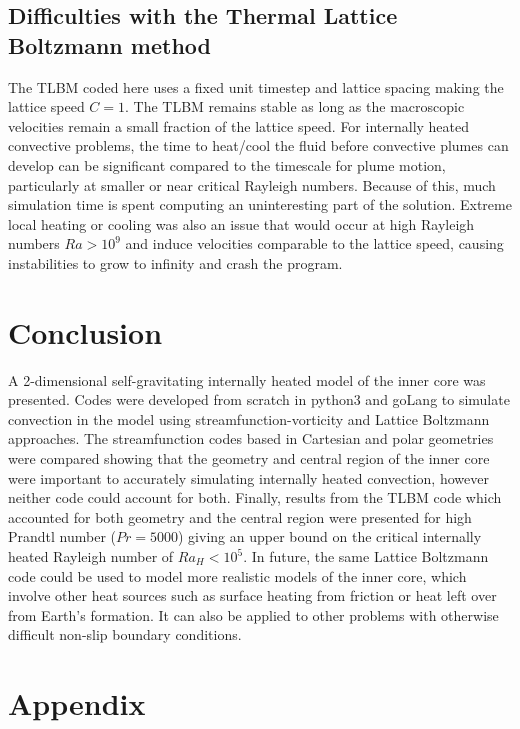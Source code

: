 \documentclass{article}
\begin{document}
\subsection*{Difficulties with the Thermal Lattice Boltzmann method}
The TLBM coded here uses a fixed unit timestep and lattice spacing making the lattice speed $C=1$. The TLBM remains stable as long as the macroscopic velocities remain a small fraction of the lattice speed. For internally heated convective problems, the time to heat/cool the fluid before convective plumes can develop can be significant compared to the timescale for plume motion, particularly at smaller or near critical Rayleigh numbers. Because of this, much simulation time is spent computing an uninteresting part of the solution. 
\newline
\noindent Extreme local heating or cooling was also an issue that would occur at high Rayleigh numbers $Ra>10^9$ and induce velocities comparable to the lattice speed, causing instabilities to grow to infinity and crash the program.
\newline



\section*{Conclusion}

A 2-dimensional self-gravitating internally heated model of the inner core was presented. Codes 
were developed from scratch in python3 and goLang to simulate convection in the model using 
streamfunction-vorticity and Lattice Boltzmann approaches. The streamfunction codes based in 
Cartesian and polar geometries were compared showing that the geometry and central region of the 
inner core were important to accurately simulating internally heated convection, however neither 
code could account for both. Finally, results from the TLBM code which accounted for both geometry 
and the central region were presented for high Prandtl number ($Pr=5000$) giving an upper bound on 
the critical internally heated Rayleigh number of $Ra_H < 10^5$. In future, the same Lattice Boltzmann
code could be used to model more realistic models of the inner core, which involve other heat sources such as surface heating from 
friction or heat left over from Earth's formation. It can also be applied to other problems with otherwise difficult non-slip
boundary conditions.




\newpage
\section*{Appendix}
\end{document}
